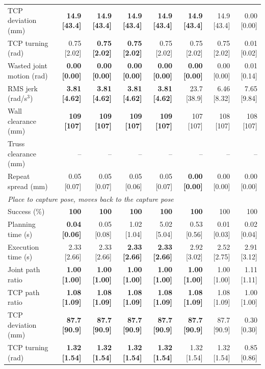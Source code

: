 \begin{table}[t]
\begin{tabular}{lrrrrrrr}
TCP deviation (mm) & \textbf{14.9 [43.4]} & \textbf{14.9 [43.4]} & \textbf{14.9 [43.4]} & \textbf{14.9 [43.4]} & \textbf{14.9 [43.4]} & 14.9 [43.4] & 0.00 [0.00] \\
TCP turning (rad) & 0.75 [2.02] & \textbf{0.75 [2.02]} & \textbf{0.75 [2.02]} & 0.75 [2.02] & 0.75 [2.02] & 0.75 [2.02] & 0.01 [0.02] \\
Wasted joint motion (rad) & \textbf{0.00 [0.00]} & \textbf{0.00 [0.00]} & \textbf{0.00 [0.00]} & \textbf{0.00 [0.00]} & \textbf{0.00 [0.00]} & 0.00 [0.00] & 0.01 [0.14] \\
RMS jerk (rad/s$^3$) & \textbf{3.81 [4.62]} & \textbf{3.81 [4.62]} & \textbf{3.81 [4.62]} & \textbf{3.81 [4.62]} & 23.7 [38.9] & 6.46 [8.32] & 7.65 [9.84] \\
Wall clearance (mm) & \textbf{109 [107]} & \textbf{109 [107]} & \textbf{109 [107]} & \textbf{109 [107]} & 107 [107] & 108 [107] & 108 [107] \\
Truss clearance (mm) & -- & -- & -- & -- & -- & -- & -- \\
Repeat spread (mm) & 0.05 [0.07] & 0.05 [0.07] & 0.05 [0.06] & 0.05 [0.07] & \textbf{0.00 [0.00]} & 0.00 [0.00] & 0.00 [0.00] \\
\midrule
\multicolumn{8}{l}{\emph{Place to capture pose, moves back to the capture pose}} \\
Success (\%) & \textbf{100} & \textbf{100} & \textbf{100} & \textbf{100} & \textbf{100} & 100 & 100 \\
Planning time (s) & \textbf{0.04 [0.06]} & 0.05 [0.08] & 1.02 [1.04] & 5.02 [5.04] & 0.53 [0.56] & 0.01 [0.03] & 0.02 [0.04] \\
Execution time (s) & 2.33 [2.66] & 2.33 [2.66] & \textbf{2.33 [2.66]} & \textbf{2.33 [2.66]} & 2.92 [3.02] & 2.52 [2.75] & 2.91 [3.12] \\
Joint path ratio & \textbf{1.00 [1.00]} & \textbf{1.00 [1.00]} & \textbf{1.00 [1.00]} & \textbf{1.00 [1.00]} & \textbf{1.00 [1.00]} & 1.00 [1.00] & 1.11 [1.11] \\
TCP path ratio & \textbf{1.08 [1.09]} & \textbf{1.08 [1.09]} & \textbf{1.08 [1.09]} & \textbf{1.08 [1.09]} & \textbf{1.08 [1.09]} & 1.08 [1.09] & 1.00 [1.00] \\
TCP deviation (mm) & \textbf{87.7 [90.9]} & \textbf{87.7 [90.9]} & \textbf{87.7 [90.9]} & \textbf{87.7 [90.9]} & \textbf{87.7 [90.9]} & 87.7 [90.9] & 0.30 [0.30] \\
TCP turning (rad) & \textbf{1.32 [1.54]} & \textbf{1.32 [1.54]} & \textbf{1.32 [1.54]} & \textbf{1.32 [1.54]} & 1.32 [1.54] & 1.32 [1.54] & 0.85 [0.86] \\

\end{tabular}
\end{table}
